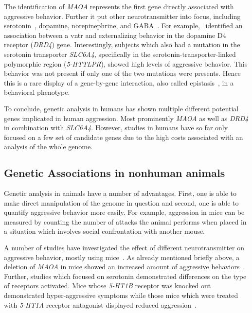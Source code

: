 The identification of \textit{MAOA} represents the first gene directly associated with aggressive behavior.
Further it put other neurotransmitter into focus, including serotonin~\cite{Murphy2008}, dopamine, norepinephrine, and GABA~\cite{Marino2005,Miczek2002}.
For example,~\citet{Hohmann2009} identified an association between a \acrfull{vntr} and externalizing behavior in the dopamine D4 receptor (\textit{DRD4}) gene.
Interestingly, subjects which also had a mutation in the serotonin transporter \textit{SLC6A4}, specifically in the serotonin-transporter-linked polymorphic region (\textit{5-HTTLPR}), showed high levels of aggressive behavior.
This behavior was not present if only one of the two mutations were presents.
Hence this is a rare display of a gene-by-gene interaction, also called epistasis~\cite{Anholt2012}, in a behavioral phenotype.

To conclude, genetic analysis in humans has shown multiple different potential genes implicated in human aggression.
Most prominently \textit{MAOA} as well as \textit{DRD4} in combination with \textit{SLC6A4}.
However, studies in humans have so far only focused on a few set of candidate genes due to the high costs associated with an analysis of the whole genome.

\subsection{Genetic Associations in nonhuman animals}
\label{sub:genetic_associations_in_animals}

Genetic analysis in animals have a number of advantages.
First, one is able to make direct manipulation of the genome in question and second, one is able to quantify aggressive behavior more easily.
For example, aggression in mice can be measured by counting the number of attacks the animal performs when placed in a situation which involves social confrontation with another mouse.

A number of studies have investigated the effect of different neurotransmitter on aggressive behavior, mostly using mice~\cite{Anholt2012}.
As already mentioned briefly above, a deletion of \textit{MAOA} in mice showed an increased amount of aggressive behaviors~\cite{Cases1995b}.
Further, studies which focused on serotonin demonstrated differences on the type of receptors activated.
Mice whose \textit{5-HT1B} receptor was knocked out demonstrated hyper-aggressive symptoms while those mice which were treated with \textit{5-HT1A} receptor antagonist displayed reduced aggression~\cite{Saudou1994,Bell1994}.

